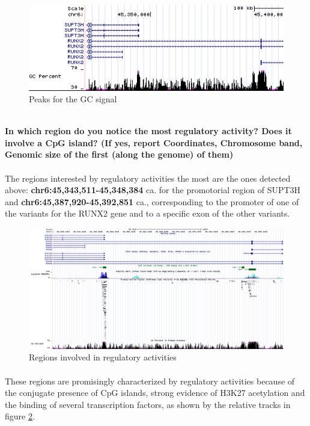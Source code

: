 \documentclass[12pt, a4paper]{article}
\begin{document}
\begin{figure}[h]
		\centering
		\label{GC peaks}
		\includegraphics[width = .8\textwidth]{GC_peaks}
		\caption{Peaks for the GC signal}
\end{figure}
	
\textbf{\\ In which region do you notice the most regulatory activity? Does it involve a CpG island? (If yes, report Coordinates, Chromosome band, Genomic size of the first (along the genome) of them)}%
\paragraph{}The regions interested by regulatory activities the most are the ones detected above: \textbf{chr6:45,343,511-45,348,384} ca. for the promotorial region of SUPT3H and \textbf{chr6:45,387,920-45,392,851} ca., corresponding to the promoter of one of the variants for the RUNX2 gene and to a specific exon of the other variants.

\begin{figure}[h]
	\centering
	\label{regulatory regions}
	\includegraphics[width = \textwidth]{regulatory_regions}
	\caption{Regions involved in regulatory activities}
\end{figure}

\paragraph{}These regions are promisingly characterized by regulatory activities because of the conjugate presence of CpG islands, strong evidence of H3K27 acetylation and the binding of several transcription factors, as shown by the relative tracks in figure \ref{regulatory regions}.
\end{document}
